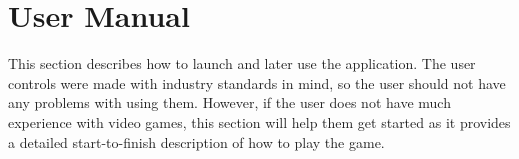 \chapter{User Manual}\label{ch:user_manual}
This section describes how to launch and later use the application.
The user controls were made with industry standards in mind, so the user should not have any problems with using them.
However, if the user does not have much experience with video games, this section will help them get started as it provides a detailed start-to-finish description of how to play the game.







